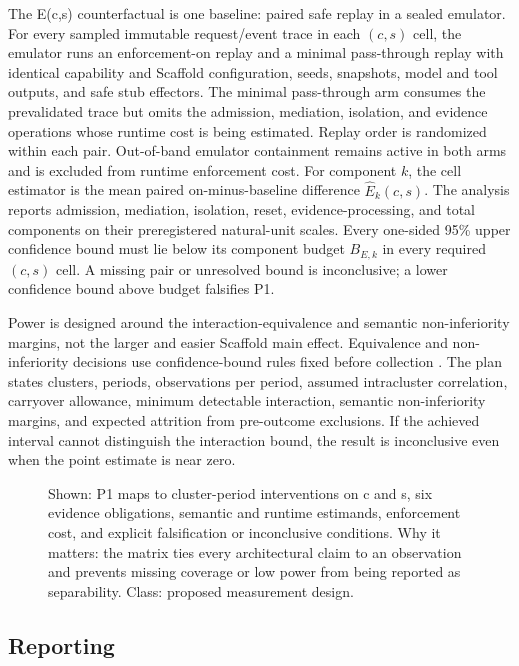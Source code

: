 The E(c,s) counterfactual is one baseline: paired safe replay in a sealed emulator. For every sampled immutable request/event trace in each $(c,s)$ cell, the emulator runs an enforcement-on replay and a minimal pass-through replay with identical capability and Scaffold configuration, seeds, snapshots, model and tool outputs, and safe stub effectors. The minimal pass-through arm consumes the prevalidated trace but omits the admission, mediation, isolation, and evidence operations whose runtime cost is being estimated. Replay order is randomized within each pair. Out-of-band emulator containment remains active in both arms and is excluded from runtime enforcement cost. For component $k$, the cell estimator is the mean paired on-minus-baseline difference $\widehat{E}_k(c,s)$. The analysis reports admission, mediation, isolation, reset, evidence-processing, and total components on their preregistered natural-unit scales. Every one-sided 95\% upper confidence bound must lie below its component budget $B_{E,k}$ in every required $(c,s)$ cell. A missing pair or unresolved bound is inconclusive; a lower confidence bound above budget falsifies P1.

Power is designed around the interaction-equivalence and semantic non-inferiority margins, not the larger and easier Scaffold main effect. Equivalence and non-inferiority decisions use confidence-bound rules fixed before collection \cite{schuirmann1987tost}. The plan states clusters, periods, observations per period, assumed intracluster correlation, carryover allowance, minimum detectable interaction, semantic non-inferiority margins, and expected attrition from pre-outcome exclusions. If the achieved interval cannot distinguish the interaction bound, the result is inconclusive even when the point estimate is near zero.

\begin{figure}[t]
\centering
\caption{Shown: P1 maps to cluster-period interventions on c and s, six evidence obligations, semantic and runtime estimands, enforcement cost, and explicit falsification or inconclusive conditions. Why it matters: the matrix ties every architectural claim to an observation and prevents missing coverage or low power from being reported as separability. Class: proposed measurement design.}
\label{fig:evaluation-matrix}
\end{figure}

\subsection{Reporting}


